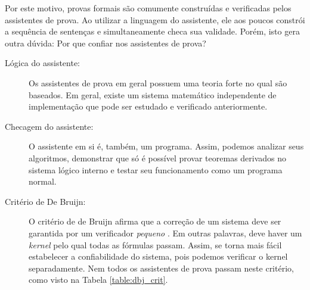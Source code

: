 Por este motivo, provas formais são comumente construídas e verificadas pelos
assistentes de prova. Ao utilizar a linguagem do assistente, ele aos poucos
constrói a sequência de sentenças e simultaneamente checa sua validade. Porém,
isto gera outra dúvida: Por que confiar nos assistentes de prova?


\begin{description}
    \item[Lógica do assistente:] Os assistentes de prova em geral possuem uma
        teoria forte no qual são baseados. Em geral, existe um sistema
        matemático independente de implementação que pode ser estudado e
        verificado anteriormente.
    \item[Checagem do assistente:] O assistente em si é, também, um programa. Assim,
        podemos analizar seus algoritmos, demonstrar que só é possível provar
        teoremas derivados no sistema lógico interno e testar seu funcionamento
        como um programa normal.
    \item[Critério de De Bruijn:] O critério de de Bruijn afirma que a correção
        de um sistema deve ser garantida por um verificador \emph{pequeno}
        \cite{freek}. Em outras palavras, deve haver um \emph{kernel} pelo qual
        todas as fórmulas passam. Assim, se torna mais fácil estabelecer a
        confiabilidade do sistema, pois podemos verificar o kernel
        separadamente. Nem todos os assistentes de prova passam neste critério,
        como visto na Tabela \ref{table:dbj_crit}.
\end{description}

